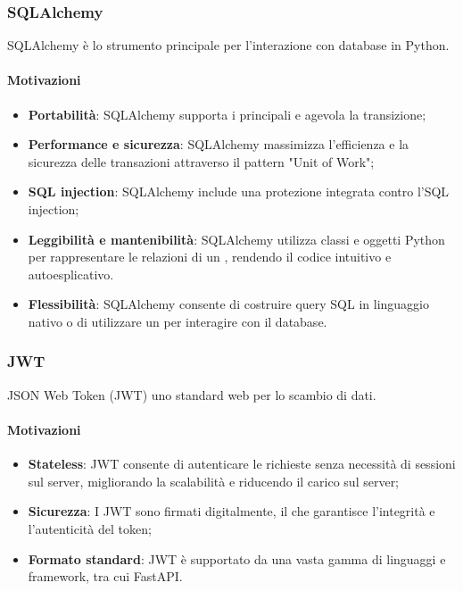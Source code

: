 \subsubsection{SQLAlchemy}\label{sec:sqlalchemy}
\par SQLAlchemy è lo strumento principale per l'interazione con database  in Python.
\paragraph*{Motivazioni}
\begin{itemize}
  \item \textbf{Portabilità}: SQLAlchemy supporta i principali  e agevola la transizione;
  \item \textbf{Performance e sicurezza}: SQLAlchemy massimizza l'efficienza e la sicurezza delle transazioni attraverso il pattern "Unit of Work";
  \item \textbf{SQL injection}: SQLAlchemy include una protezione integrata contro l'SQL injection;
  \item \textbf{Leggibilità e mantenibilità}: SQLAlchemy utilizza classi e oggetti Python per rappresentare le relazioni di un , rendendo il codice intuitivo e autoesplicativo.
  \item \textbf{Flessibilità}: SQLAlchemy consente di costruire query SQL in linguaggio nativo o di utilizzare un  per interagire con il database.
\end{itemize}

\subsubsection{JWT}\label{sec:jwt}
\par JSON Web Token (JWT) uno standard web per lo scambio di dati.
\paragraph*{Motivazioni}
\begin{itemize}
  \item \textbf{Stateless}: JWT consente di autenticare le richieste senza necessità di sessioni sul server, migliorando la scalabilità e riducendo il carico sul server;
  \item \textbf{Sicurezza}: I JWT sono firmati digitalmente, il che garantisce l'integrità e l'autenticità del token;
  \item \textbf{Formato standard}: JWT è supportato da una vasta gamma di linguaggi e framework, tra cui FastAPI.
\end{itemize}

